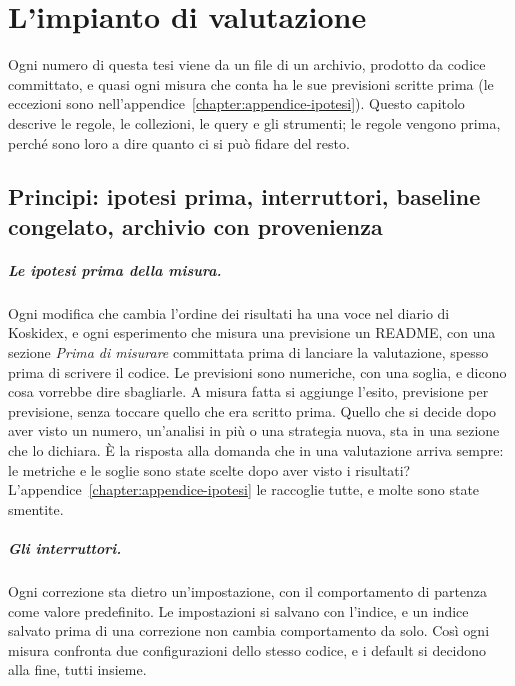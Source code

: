 \chapter{L'impianto di valutazione}\label{chapter:valutazione}

Ogni numero di questa tesi viene da un file di un archivio, prodotto da codice
committato, e quasi ogni misura che conta ha le sue previsioni scritte prima (le eccezioni
sono nell'appendice~\ref{chapter:appendice-ipotesi}). Questo
capitolo descrive le regole, le collezioni, le query e gli strumenti; le regole
vengono prima, perché sono loro a dire quanto ci si può fidare del resto.

\section{Principi: ipotesi prima, interruttori, baseline congelato, archivio con provenienza}\label{sec:principi}

\paragraph{Le ipotesi prima della misura.} Ogni modifica che cambia l'ordine dei
risultati ha una voce nel diario di Koskidex, e ogni esperimento che misura una
previsione un README, con una sezione \emph{Prima di misurare} committata prima di lanciare la
valutazione, spesso prima di scrivere il codice. Le previsioni sono numeriche,
con una soglia, e dicono cosa vorrebbe dire sbagliarle. A misura fatta si
aggiunge l'esito, previsione per previsione, senza toccare quello che era scritto
prima. Quello che si decide dopo aver visto un numero, un'analisi in più o una
strategia nuova, sta in una sezione che lo dichiara. È la risposta alla domanda
che in una valutazione arriva sempre: le metriche e le soglie sono state scelte
dopo aver visto i risultati? L'appendice~\ref{chapter:appendice-ipotesi} le raccoglie
tutte, e molte sono state smentite.

\paragraph{Gli interruttori.} Ogni correzione sta dietro un'impostazione, con il
comportamento di partenza come valore predefinito. Le impostazioni si salvano con
l'indice, e un indice salvato prima di una correzione non cambia comportamento da
solo. Così ogni misura confronta due configurazioni dello stesso codice, e i
default si decidono alla fine, tutti insieme.

